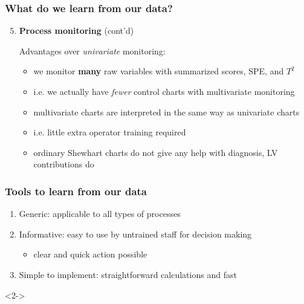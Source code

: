 \begin{frame}\frametitle{What do we learn from our data?}

\begin{enumerate}
	\setcounter{enumi}{4}
	\item 	{\bf \color{myGreen}Process monitoring} (cont'd)	

	\vspace{10pt}	
			Advantages over \emph{univariate} monitoring:
		
			\begin{itemize}
				\item 	we monitor \textbf{many} raw variables with summarized scores, SPE, and \( T^2 \)
				\item 	i.e. we actually have \emph{fewer} control charts with multivariate monitoring
				\item 	multivariate charts are interpreted in the same way as univariate charts
				\item 	i.e. little extra operator training required
				\item 	ordinary Shewhart charts do not give any help with diagnosis, LV contributions do
			\end{itemize}	
\end{enumerate}
\end{frame}

\begin{frame}\frametitle{Tools to learn from our data}

\begin{enumerate}
	\item 	\alert{Generic}: applicable to all types of processes
	\item 	\alert{Informative}: easy to use by untrained staff for decision making
		\begin{itemize}
			\item clear and quick action possible
		\end{itemize}
	\item 	\alert{Simple to implement}: straightforward calculations and fast
\end{enumerate}

\vspace{1cm}

\begin{exampleblock}{}<2->
\end{exampleblock}
\end{frame}


